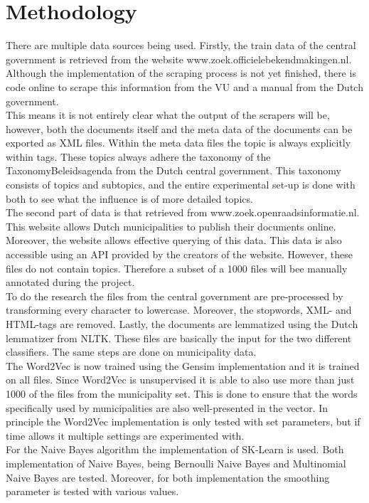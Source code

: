 \documentclass[a4paper]{article}
\begin{document}
	
\section{Methodology}
There are multiple data sources being used. Firstly, the train data of the central government is retrieved from the website www.zoek.officielebekendmakingen.nl. Although the implementation of the scraping process is not yet finished, there is code online to scrape this information from the VU and a manual from the Dutch government. \cite{GithubVU, GovernmentManual} \\
This means it is not entirely clear what the output of the scrapers will be, however, both the documents itself and the meta data of the documents can be exported as XML files. Within the meta data files the topic is always explicitly within tags. These topics always adhere the taxonomy of the TaxonomyBeleidsagenda from the Dutch central government. This taxonomy consists of topics and subtopics, and the entire experimental set-up is done with both to see what the influence is of more detailed topics.\\
The second part of data is that retrieved from www.zoek.openraadsinformatie.nl. This website allows Dutch municipalities to publish their documents online. Moreover, the website allows effective querying of this data. This data is also accessible using an API provided by the creators of the website. However, these files do not contain topics. Therefore a subset of a 1000 files will bee manually annotated during the project. \\
To do the research the files from the central government are pre-processed by transforming every character to lowercase. Moreover, the stopwords, XML- and HTML-tags are removed. Lastly, the documents are lemmatized using the Dutch lemmatizer from NLTK. These files are basically the input for the two different classifiers. The same steps are done on municipality data.\\
The Word2Vec is now trained using the Gensim implementation and it is trained on all files. Since Word2Vec is unsupervised it is able to also use more than just 1000 of the files from the municipality set. This is done to ensure that the words specifically used by municipalities are also well-presented in the vector. In principle the Word2Vec implementation is only tested with set parameters, but if time allows it multiple settings are experimented with. \\
For the Naive Bayes algorithm the implementation of SK-Learn is used. Both implementation of Naive Bayes, being Bernoulli Naive Bayes and Multinomial Naive Bayes are tested. Moreover, for both implementation the smoothing parameter is tested with various values.\\
\end{document}
